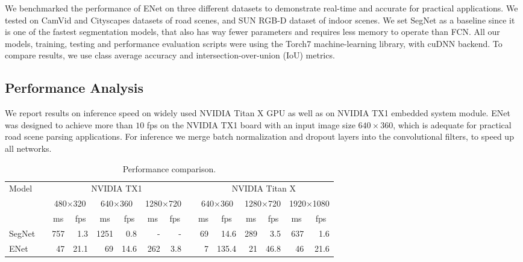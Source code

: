 \documentclass{article}
\begin{document}
We benchmarked the performance of ENet on three different datasets to demonstrate real-time and accurate for practical applications.
We tested on CamVid and Cityscapes datasets of road scenes, and SUN RGB-D dataset of indoor scenes.
We set SegNet \cite{badrinarayanan15} as a baseline since it is one of the fastest segmentation models, that also has way fewer parameters and requires less memory to operate than FCN.
All our models, training, testing and performance evaluation scripts were using the Torch7 machine-learning library, with cuDNN backend.
To compare results, we use class average accuracy and intersection-over-union (IoU) metrics.


\subsection{Performance Analysis}

We report results on inference speed on widely used NVIDIA Titan X GPU as well as on NVIDIA TX1 embedded system module.
ENet was designed to achieve more than $10$ fps on the NVIDIA TX1 board with an input image size $640 \times 360$, which is adequate for practical road scene parsing applications.
For inference we merge batch normalization and dropout layers into the convolutional filters, to speed up all networks.

\newcommand{\resolution}[2]{\multicolumn{2}{c}{#1$\times$#2}}
\newcommand{\ms}{\multicolumn{1}{c}{ms}}
\newcommand{\fps}{\multicolumn{1}{c}{fps}}
\begin{table}[htb]
  \footnotesize
  \caption{Performance comparison.}
  \vspace{0.05in}
  \label{tab:speed}
  \centering
  \begin{tabular}{ l r r r r r r r r r r r r r r }
    \toprule
    \multirow{3}{*}{Model} &&\multicolumn{6}{c}{NVIDIA TX1} &  &\multicolumn{6}{c}{NVIDIA Titan X} \\
    \cmidrule{3-8} \cmidrule{10-15}
            &&\resolution{480}{320} &\resolution{640}{360}&\resolution{1280}{720} &
            &\resolution{640}{360}&\resolution{1280}{720}&\resolution{1920}{1080} \\
            &&\ms &\fps &\ms &\fps &\ms &\fps & &\ms&\fps &\ms&\fps &\ms&\fps \\
    \midrule
    SegNet  &&757    &1.3     &1251   &0.8   &-    &-    & &69     &14.6   &289  &3.5    &637    &1.6     \\
    ENet    &&47     &21.1    &69     &14.6  &262  &3.8  & &7      &135.4  &21   &46.8   &46     &21.6   \\
    \bottomrule
  \end{tabular}
\end{table}
\end{document}
